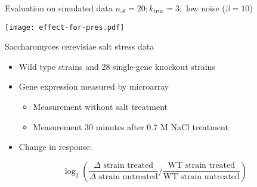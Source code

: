 \documentclass[aspectratio=169]{beamer}
\begin{document}

\begin{frame}{Evaluation on simulated data}
$n_\mathcal{A}=20; k_\text{true}=3;$ low noise ($\beta=10$)

\texttt{[image: effect-for-pres.pdf]}
\end{frame}


\begin{frame}{Saccharomyces cerevisiae salt stress data}
\begin{itemize}
 \item Wild type strains and 28 single-gene knockout strains
 \item Gene expression measured by microarray
  \begin{itemize}
   \item \normalsize Measurement without salt treatment
   \item \normalsize Measurement 30 minutes after 0.7 M NaCl treatment
  \end{itemize}
 \item Change in response:
\end{itemize}
\[
 \log_2 \left( \frac{\Delta \text{ strain treated}}{\Delta \text{ strain untreated}} \bigg/ \frac{\text{WT strain treated}}{\text{WT strain untreated}} \right)
\]
\vfill
{\parencite{berry2008stress, lee2011dynamic} \\}
\end{frame}

\end{document}
